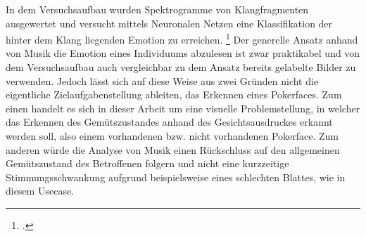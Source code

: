 \documentclass[12pt, a4paper]{scrbook}
\begin{document}
In dem Versuchsaufbau wurden Spektrogramme von Klangfragmenten ausgewertet und versucht mittels Neuronalen Netzen eine Klassifikation der hinter dem Klang liegenden Emotion zu erreichen.
\footcite[Vgl. ][Abstract]{EmotionInSound}
Der generelle Ansatz anhand von Musik die Emotion eines Individuums abzulesen ist zwar praktikabel und von dem Versuchsaufbau auch vergleichbar zu dem Ansatz bereits gelabelte Bilder zu verwenden. Jedoch lässt sich auf diese Weise aus zwei Gründen nicht die eigentliche Zielaufgabenstellung ableiten, das Erkennen eines Pokerfaces. Zum einen handelt es sich in dieser Arbeit um eine visuelle Problemstellung, in welcher das Erkennen des Gemütszustandes anhand des Gesichtsausdruckes erkannt werden soll, also einem vorhandenen bzw. nicht vorhandenen Pokerface. Zum anderen würde die Analyse von Musik einen Rückschluss auf den allgemeinen Gemütszustand des Betroffenen folgern und nicht eine kurzzeitige Stimmungsschwankung aufgrund beispielsweise eines schlechten Blattes, wie in diesem Usecase.

\let\cleardoublepage\relax
\newpage

\printbibheading
\printbibliography[type=book,heading=subbibliography,title={Literaturquellen}]
\pagestyle{empty}
\printbibliography[type=misc,heading=subbibliography,title={Sonstige Quellen}]
\pagestyle{empty}
\newpage
\pagestyle{empty}
\end{document}
